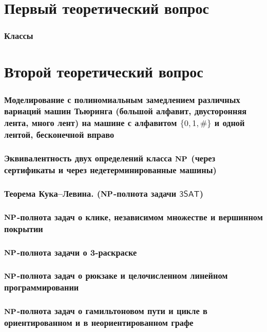 

\newpage
\part{Первый теоретический вопрос}

\section*{Классы}


\newpage
\part{Второй теоретический вопрос}

\section{Моделирование с полиномиальным замедлением различных вариаций машин Тьюринга (большой алфавит, двусторонняя лента, много лент) на машине с алфавитом $\{0,1,\#\}$ и одной лентой, бесконечной вправо}

\section{Эквивалентность двух определений класса $\textbf{NP}$ (через сертификаты и через недетерминированные машины)}

\section{Теорема Кука–Левина. ($\textbf{NP}$-полнота задачи $\mathsf{3SAT}$)}

\section{$\textbf{NP}$-полнота задач о клике, независимом множестве и вершинном покрытии}\label{sec:question4}

\section{$\textbf{NP}$-полнота задачи о 3-раскраске}

\section{$\textbf{NP}$-полнота задач о рюкзаке и целочисленном линейном программировании}

\section{$\textbf{NP}$-полнота задач о гамильтоновом пути и цикле в ориентированном и в неориентированном графе}\label{sec:question7}

